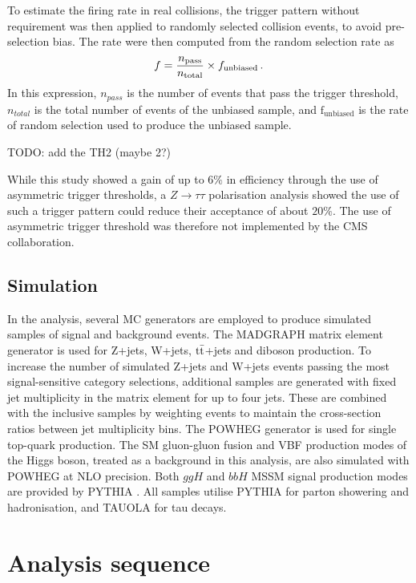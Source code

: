 To estimate the firing rate in real collisions, the trigger pattern without \pt requirement was then applied to randomly selected collision events, to avoid pre-selection bias.  The rate were then computed from the random selection rate as
\begin{equation}
    f = \frac{n_{\mathrm{pass}}}{n_{\mathrm{total}}} \times f_{\mathrm{unbiased}} \mend
\end{equation}
In this expression, $n_{pass}$ is the number of events that pass the trigger threshold, $n_{total}$ is the total number of events of the unbiased sample, and $\mathrm{f}_{\mathrm{unbiased}}$ is the rate of random selection used to produce the unbiased sample. 

TODO: add the TH2 (maybe 2?)

While this study showed a gain of up to $6\%$ in efficiency through the use of asymmetric trigger thresholds, a $Z\rightarrow \tau\tau$ polarisation analysis showed the use of such a trigger pattern could reduce their acceptance of about $20\%$. The use of asymmetric \tauh trigger \pt threshold was therefore not implemented by the CMS collaboration.

\subsection{Simulation}
In the analysis, several MC generators are employed to produce simulated samples of signal and background events. The MADGRAPH \cite{Alwall2011} matrix element generator is used for Z+jets, W+jets, $\mathrm{t\Bar{t}}$+jets and diboson production. To increase the number of simulated Z+jets and W+jets events passing the most signal-sensitive category selections, additional samples are generated with fixed jet multiplicity in the matrix element for up to four jets. These are combined with the inclusive samples by weighting events to maintain the cross-section ratios between jet multiplicity bins. The POWHEG \cite{Alioli2010} generator is used for single top-quark production. The SM gluon-gluon fusion and VBF production modes of the Higgs boson, treated as a background in this analysis, are also simulated with POWHEG at NLO precision. Both $ggH$ and $bbH$ MSSM signal production modes are provided by PYTHIA \cite{SJOSTRAND2008852}. All samples utilise PYTHIA for parton showering and hadronisation, and TAUOLA \cite{JADACH1991275} for tau decays.


\section{Analysis sequence}
\label{sec:analysis_eventsel}

